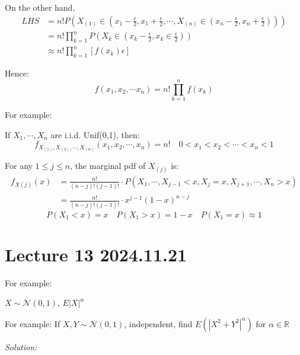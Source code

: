 \documentclass{article}
\begin{document}
\bigskip

On the other hand, 
\begin{align*}
    LHS &= n! P(X_{(1)} \in (x_{1} - \frac{\epsilon}{2}, x_{1} + \frac{\epsilon}{2}, \cdots , X_{(n)} \in (x_{n} - \frac{\epsilon}{2}, x_{n} + \frac{\epsilon}{2})))\\
        &= n! \prod_{k=1}^{n}P(X_{k} \in (x_{k} - \frac{\epsilon}{2}, x_{k} \in \frac{\epsilon}{2}))\\
        &\approx n! \prod_{k=1}^{n}[f(x_{k}) \epsilon]
\end{align*}

Hence:
\[ f(x_{1}, x_{2} ,\cdots x_{n}) = n! \prod_{k=1}^{n} f(x_{k})  \]

For example:

If $X_{1}, \cdots ,X_{n}$ are i.i.d. Unif(0,1), then:
\[ f_{X_{(1)},X_{(2)},\cdots,X_{(n)}} (x_{1}, x_{2}, \cdots , x_{n}) = n! \quad 0<x_{1}<x_{2}<\cdots<x_{n}<1 \]

\bigskip

For any $1\leq j \leq n$, the marginal pdf of $X_{(j)}$ is:
\begin{align*}
    f_{X(j)} (x) &= \frac{n!}{(n-j)!(j-1)!} \cdot P(X_{1},\cdots,X_{j-1} <x,X_{j} = x, X_{j+1},\cdots , X_{n} >x)\\
                 &= \frac{n!}{(n-j)!(j-1)!} \cdot x^{j-1} (1-x)^{n-j}
\end{align*}
\[ P(X_{1} < x) = x \quad P(X_{1}>x) = 1-x \quad P(X_{1} = x) \approx 1\]








\section{Lecture 13 2024.11.21}

For example:

$X \sim \mathcal{N}(0,1)$, $E|X|^{\alpha}$


For example:
If $X,Y \sim \mathcal{N}(0,1) $, independent, find $E(|X^{2}+Y^{2}|^{\alpha})$ for $\alpha \in \mathbb{R}$

\emph{Solution:}
\end{document}
